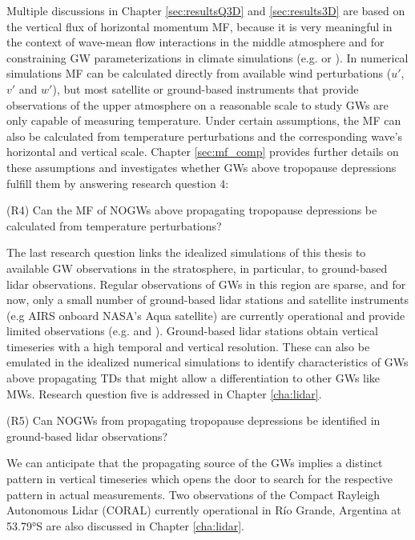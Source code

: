Multiple discussions in Chapter \ref{sec:resultsQ3D} and \ref{sec:results3D} are based on the vertical flux of horizontal momentum MF, because it is very meaningful in the context of wave-mean flow interactions in the middle atmosphere and for constraining GW parameterizations in climate simulations (e.g. \cite[]{geller_comparison_2013} or \cite[]{kim_overview_2003}). In numerical simulations MF can be calculated directly from available wind perturbations ($u'$,$v'$ and $w'$), but most satellite or ground-based instruments that provide observations of the upper atmosphere on a reasonable scale to study GWs are only capable of measuring temperature. Under certain assumptions, the MF can also be calculated from temperature perturbations and the corresponding wave's horizontal and vertical scale. Chapter \ref{sec:mf_comp} provides further details on these assumptions and investigates whether GWs above tropopause depressions fulfill them by answering research question 4:
\begin{tcolorbox}[]
    (R4) Can the MF of NOGWs above propagating tropopause depressions be calculated from temperature perturbations?
\end{tcolorbox}

The last research question links the idealized simulations of this thesis to available GW observations in the stratosphere, in particular, to ground-based lidar observations. Regular observations of GWs in this region are sparse, and for now, only a small number of ground-based lidar stations and satellite instruments (e.g AIRS onboard NASA's Aqua satellite) are currently operational and provide limited observations (e.g. \cite[]{kaifler_compact_2021} and \cite[]{hindley_18year_2020}). Ground-based lidar stations obtain vertical timeseries with a high temporal and vertical resolution. These can also be emulated in the idealized numerical simulations to identify characteristics of GWs above propagating TDs that might allow a differentiation to other GWs like MWs. Research question five is addressed in Chapter \ref{cha:lidar}.
\begin{tcolorbox}[]
    (R5) Can NOGWs from propagating tropopause depressions be identified in ground-based lidar observations?
\end{tcolorbox}
We can anticipate that the propagating source of the GWs implies a distinct pattern in vertical timeseries which opens the door to search for the respective pattern in actual measurements. Two observations of the Compact Rayleigh Autonomous Lidar (CORAL) currently operational in Río Grande, Argentina at 53.79°S are also discussed in Chapter \ref{cha:lidar}.

